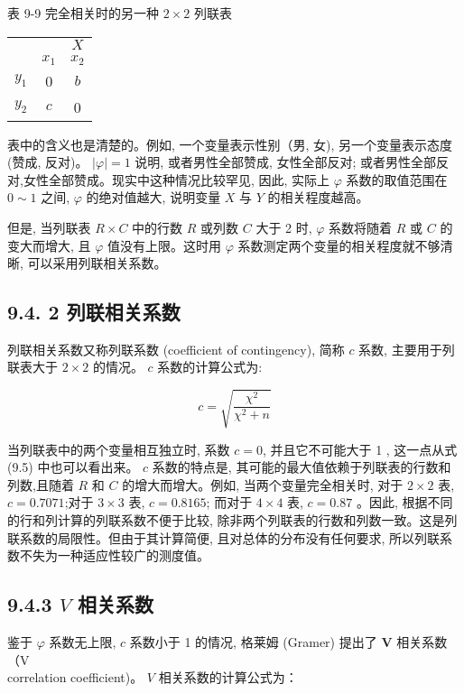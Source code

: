 \documentclass[10pt]{article}
\begin{document}
\begin{CJK*}{UTF8}{bsmi}
表 9-9 完全相关时的另一种 $2 \times 2$ 列联表

\begin{center}
\begin{tabular}{ccc}
\hline
 &  & $X$ \\
\cline { 2 - 3 }
 & $x_{1}$ & $x_{2}$ \\
\hline
$y_{1}$ & 0 & $b$ \\
$y_{2}$ & $c$ & 0 \\
\hline
\end{tabular}
\end{center}

表中的含义也是清楚的。例如, 一个变量表示性别（男, 女), 另一个变量表示态度 (赞成, 反对)。 $|\varphi|=1$ 说明, 或者男性全部赞成, 女性全部反对; 或者男性全部反对,女性全部赞成。现实中这种情况比较罕见, 因此, 实际上 $\varphi$ 系数的取值范围在 $0 \sim 1$ 之间, $\varphi$ 的绝对值越大, 说明变量 $X$ 与 $Y$ 的相关程度越高。

但是, 当列联表 $R \times C$ 中的行数 $R$ 或列数 $C$ 大于 2 时, $\varphi$ 系数将随着 $R$ 或 $C$ 的变大而增大, 且 $\varphi$ 值没有上限。这时用 $\varphi$ 系数测定两个变量的相关程度就不够清晰, 可以采用列联相关系数。

\subsection*{9.4. 2 列联相关系数}
列联相关系数又称列联系数 (coefficient of contingency), 简称 $c$ 系数, 主要用于列联表大于 $2 \times 2$ 的情况。 $c$ 系数的计算公式为:


\begin{equation*}
c=\sqrt{\frac{\chi^{2}}{\chi^{2}+n}} \tag{9.5}
\end{equation*}


当列联表中的两个变量相互独立时, 系数 $c=0$, 并且它不可能大于 1 , 这一点从式 (9.5) 中也可以看出来。 $c$ 系数的特点是, 其可能的最大值依赖于列联表的行数和列数,且随着 $R$ 和 $C$ 的增大而增大。例如, 当两个变量完全相关时, 对于 $2 \times 2$ 表, $c=0.7071$;对于 $3 \times 3$ 表, $c=0.8165$; 而对于 $4 \times 4$ 表, $c=0.87$ 。因此, 根据不同的行和列计算的列联系数不便于比较, 除非两个列联表的行数和列数一致。这是列联系数的局限性。但由于其计算简便, 且对总体的分布没有任何要求, 所以列联系数不失为一种适应性较广的测度值。

\subsection*{9.4.3 $V$ 相关系数}
鉴于 $\varphi$ 系数无上限, $c$ 系数小于 1 的情况, 格莱姆 (Gramer) 提出了 $\boldsymbol{V}$ 相关系数（V\\
correlation coefficient)。 $V$ 相关系数的计算公式为：



\end{CJK*}
\end{document}
